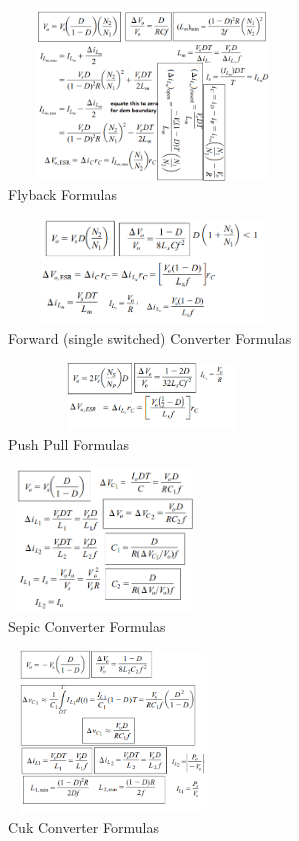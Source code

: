 \documentclass[twocolumn, ]{article}
\begin{document}
\begin{figure}[!ht]
	\includegraphics[width=3in,height=1.8in]{flybackformulasfromhart.png}
	\caption{Flyback Formulas}
\end{figure}
\begin{figure}[!ht]
	\includegraphics[width=3in,height=1.1in]{forwardsingleswitch.png}
	\caption{Forward (single switched) Converter Formulas}
\end{figure}
\begin{figure}[!ht]
	\includegraphics[width=3in,height=0.7in]{pushpull_someformulas.png}
	\caption{Push Pull Formulas}
\end{figure}




\begin{figure}[!ht]
	\includegraphics[width=2in,height=1.5in]{sepicformulas.png}
	\caption{Sepic Converter Formulas}
\end{figure}
\begin{figure}[!ht]
	\includegraphics[width=2.2in,height=1.7in]{cukformulas.png}
	\caption{Cuk Converter Formulas}
\end{figure}
\end{document}
